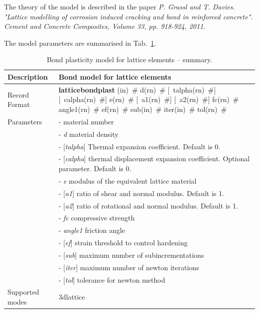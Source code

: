 \documentclass[a4paper]{article}
\newcommand{\descitem}[1]{{\noindent \bf #1}}
\newcommand{\elemparam}[2]{{{#1\tiny (#2)}~\#}}
\newcommand{\optelemparam}[2]{[{~\elemparam{#1}{#2}}]}
\newcommand{\param}[1]{{\it #1}}
\newcommand{\optparam}[1]{[{\it #1}]}
\newenvironment{mmt}{\begin{tabular}{|l|p{9cm}|}}{\end{tabular}\\}
\newenvironment{mmt}{\begin{tabular}{|l|l|}}{\end{tabular}\\}
\begin{document}
The theory of the model is described in the paper \textit{P. Grassl and T. Davies. "Lattice modelling of corrosion induced cracking and bond in reinforced concrete". Cement and Concrete Composites, Volume 33, pp. 918-924, 2011}.

The model parameters are summarised in Tab.~\ref{latticebond_table}.

\begin{table}[!htb]
\begin{mmt}
\hline
Description & Bond model for lattice elements \\
\hline
Record Format & \descitem{latticebondplast} \elemparam{}{in} 
\elemparam{d}{rn} \optelemparam{talpha}{rn} \optelemparam{calpha}{rn} \elemparam{e}{rn} \optelemparam{a1}{rn} \optelemparam{a2}{rn} \elemparam{fc}{rn} \elemparam{angle1}{rn} \elemparam{ef}{rn} \elemparam{sub}{in} \elemparam{iter}{in} \elemparam{tol}{rn}\\
Parameters &- \param{} material number\\
&- \param{d} material density\\
&- \optparam{talpha} Thermal expansion coefficient. Default is 0.\\
&- \optparam{calpha} thermal displacement expansion coefficient. Optional parameter. Default is 0.\\
&- \param{e} modulus of the equivalent lattice material\\
&- \optparam{a1} ratio of shear and normal modulus. Default is 1.\\
&- \optparam{a2} ratio of rotational and normal modulus. Default is 1.\\
&- \param{fc} compressive strength\\
&- \param{angle1} friction angle\\
&- \optparam{ef} strain threshold to control hardening\\
&- \optparam{sub} maximum number of subincrementations\\
&- \optparam{iter} maximum number of newton iterations\\
&- \optparam{tol} tolerance for newton method\\

Supported modes & 3dlattice\\
\hline
\end{mmt}
\caption{Bond plasticity model for lattice elements -- summary.}
\label{latticebond_table}
\end{table}
\end{document}
